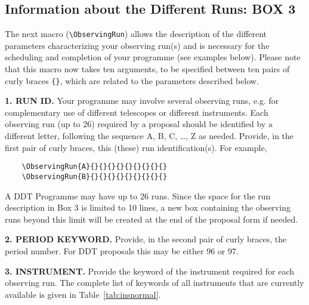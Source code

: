 \documentclass{article}
\begin{document}

\subsection{Information about the Different Runs: {\bf BOX 3}}
\label{sec:obsrun}

The next macro (\verb|\ObservingRun|) allows the description of the
different parameters characterizing your observing run(s) and is
necessary for the scheduling and completion of your programme (see
examples below). Please note that this macro now takes ten arguments, to be specified
between ten pairs of curly braces \verb|{}|, which are related to the
parameters described below.

\medskip

{\bf 1. RUN ID.} Your programme may involve several observing
runs, e.g. for complementary use of different telescopes or
different instruments. Each observing run (up to 26) required by a
proposal should be identified by a different letter, following the
sequence A, B, C, \dots, Z as needed.  Provide, in the first pair of
curly braces, this (these) run identification(s).  For example,
\begin{verbatim}
    \ObservingRun{A}{}{}{}{}{}{}{}{}{}
    \ObservingRun{B}{}{}{}{}{}{}{}{}{}
\end{verbatim}
A DDT Programme may have up to 26 runs. Since the space for the
run description in Box 3 is limited to 10 lines, a new box containing
the observing runs beyond this limit will be created at the end of the
proposal form if needed. 

\medskip

{\bf 2. PERIOD KEYWORD.} Provide, in the second pair of curly
braces, the period number.  For DDT proposals this may be 
either 96 or 97. 

\medskip

{\bf 3. INSTRUMENT.} Provide the keyword of the instrument required
for each observing run. The complete list of keywords of all
instruments that are currently available is 
given in Table~\ref{tab:insnormal}. 
\end{document}

